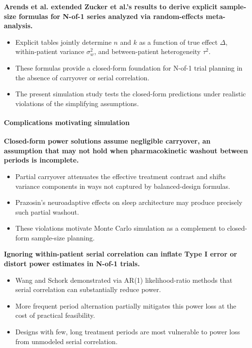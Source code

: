 \documentclass[
  11pt,
]{article}
\begin{document}
\textbf{Arends et al. extended Zucker et al.'s results to derive explicit sample-size formulas for N-of-1 series analyzed via random-effects meta-analysis.}

\begin{itemize}\setlength{\itemsep}{2pt}\setlength{\parskip}{0pt}
\item Explicit tables jointly determine $n$ and $k$ as a function of true effect $\Delta$, within-patient variance $\sigma^2_w$, and between-patient heterogeneity $\tau^2$.
\item These formulas provide a closed-form foundation for N-of-1 trial planning in the absence of carryover or serial correlation.
\item The present simulation study tests the closed-form predictions under realistic violations of the simplifying assumptions.
\end{itemize}

\paragraph{Complications motivating simulation}\label{complications-motivating-simulation}

\textbf{Closed-form power solutions assume negligible carryover, an assumption that may not hold when pharmacokinetic washout between periods is incomplete.}

\begin{itemize}\setlength{\itemsep}{2pt}\setlength{\parskip}{0pt}
\item Partial carryover attenuates the effective treatment contrast and shifts variance components in ways not captured by balanced-design formulas.
\item Prazosin's neuroadaptive effects on sleep architecture may produce precisely such partial washout.
\item These violations motivate Monte Carlo simulation as a complement to closed-form sample-size planning.
\end{itemize}

\textbf{Ignoring within-patient serial correlation can inflate Type I error or distort power estimates in N-of-1 trials.}

\begin{itemize}\setlength{\itemsep}{2pt}\setlength{\parskip}{0pt}
\item Wang and Schork demonstrated via AR(1) likelihood-ratio methods that serial correlation can substantially reduce power.
\item More frequent period alternation partially mitigates this power loss at the cost of practical feasibility.
\item Designs with few, long treatment periods are most vulnerable to power loss from unmodeled serial correlation.
\end{itemize}
\end{document}
